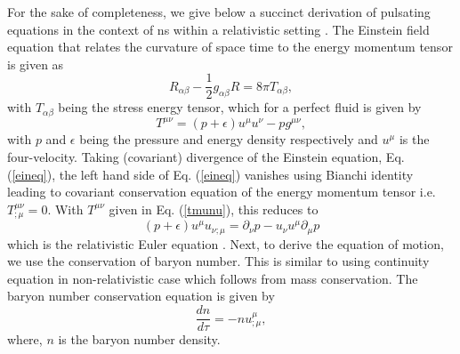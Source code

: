\documentclass[a4paper, 11pt]{article}
\def\be{\begin{equation}}
\def\ee{\end{equation}}
\begin{document}
For the sake of completeness, we give below a succinct derivation of pulsating equations in the context of \ac{ns} within a relativistic setting \cite{McDermott:1983, Gregorian:2014}. The Einstein field equation that relates the curvature of space time to the energy momentum tensor is given as
\be
R_{\alpha\beta}-\frac{1}{2}g_{\alpha\beta}R=8\pi T_{\alpha\beta}, \label{eineq}
\ee
with $T_{\alpha\beta}$ being the stress energy tensor, which for a perfect fluid is given by
\be
T^{\mu\nu}=(p+\epsilon)u^\mu u^\nu-p g^{\mu\nu}, \label{tmunu}
\ee
with $p$ and $\epsilon$ being the pressure and energy density respectively and $u^\mu$ is the four-velocity. Taking (covariant) divergence of the Einstein equation, Eq. (\ref{eineq}), the left hand side of Eq. (\ref{eineq}) vanishes using Bianchi identity leading to covariant conservation equation of the energy momentum tensor i.e. $T^{\mu\nu}_{;\mu}=0$. With $T^{\mu\nu}$ given in Eq. (\ref{tmunu}), this reduces to
\be
(p+\epsilon)u^\mu u_{\nu;\mu}=\partial_\nu p-u_\nu u^\mu \partial_\mu p \label{euler}
\ee 
which is the relativistic Euler equation \cite{Gregorian:2014}. Next, to derive the equation of motion, we use the conservation of baryon number. This is similar to using continuity equation in non-relativistic case which follows from mass conservation. The baryon number conservation equation is given by
\be
\frac{dn}{d\tau}=-n u^\mu_{;\mu}, \label{bconsv}
\ee
where, $n$ is the baryon number density.
\end{document}
